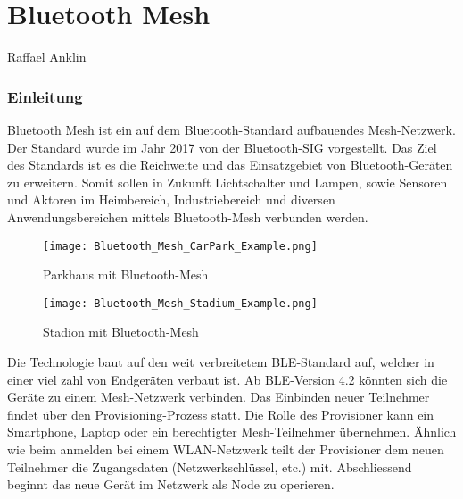 \vspace*{4cm}
\part{Bluetooth Mesh}\label{part:BluetoothMesh}
Raffael Anklin
\vspace*{\fill}
\clearpage

\section{Einleitung}\label{sec:EinleitungBluetooth}


Bluetooth Mesh ist ein auf dem Bluetooth-Standard aufbauendes Mesh-Netzwerk. Der Standard wurde im Jahr 2017 von der Bluetooth-SIG vorgestellt. Das Ziel des Standards ist es die Reichweite und das Einsatzgebiet von Bluetooth-Geräten zu erweitern. Somit sollen in Zukunft Lichtschalter und Lampen, sowie Sensoren und Aktoren im Heimbereich, Industriebereich und diversen Anwendungsbereichen mittels Bluetooth-Mesh verbunden werden.  \\

\begin{figure}[!htbp]
	\begin{minipage}{0.49\textwidth}
		\centering
		\texttt{[image: Bluetooth\_Mesh\_CarPark\_Example.png]}
		\caption[Parkhaus mit Bluetooth-Mesh]{Parkhaus mit Bluetooth-Mesh \cite{bluetooth_sig_mesh-technology-overviewpdf_2020}}
		\label{fig:BluetoothMeshParkingExample}
	\end{minipage}
	\begin{minipage}{0.49\textwidth}
		\centering
		\texttt{[image: Bluetooth\_Mesh\_Stadium\_Example.png]}
		\caption[Stadion mit Bluetooth-Mesh]{Stadion mit Bluetooth-Mesh \cite{bluetooth_sig_mesh-technology-overviewpdf_2020}}
		\label{fig:BluetoothMeshStadiumExample}
	\end{minipage}
\end{figure}


Die Technologie baut auf den weit verbreitetem BLE-Standard auf, welcher in einer viel zahl von Endgeräten verbaut ist. Ab BLE-Version 4.2 könnten sich die Geräte zu einem Mesh-Netzwerk verbinden. Das Einbinden neuer Teilnehmer findet über den Provisioning-Prozess statt. Die Rolle des Provisioner kann ein Smartphone, Laptop oder ein berechtigter Mesh-Teilnehmer übernehmen. Ähnlich wie beim anmelden bei einem WLAN-Netzwerk teilt der Provisioner dem neuen Teilnehmer die Zugangsdaten (Netzwerkschlüssel, etc.) mit. Abschliessend beginnt das neue Gerät im Netzwerk als Node zu operieren. \\  

